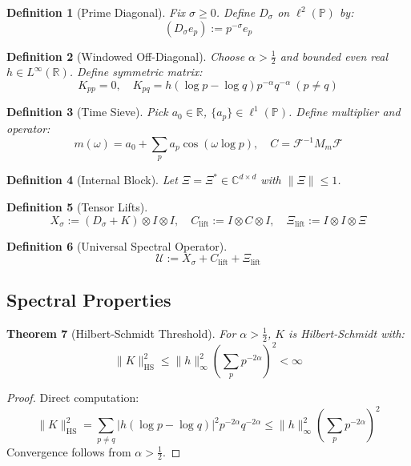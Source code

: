 \documentclass[10pt]{article}
\newtheorem{theorem}{Theorem}
\newtheorem{definition}[theorem]{Definition}
\newcommand{\PP}{\mathbb{P}}
\newcommand{\RR}{\mathbb{R}}
\newcommand{\CC}{\mathbb{C}}
\newcommand{\UU}{\mathcal{U}}
\begin{document}
\begin{definition}[Prime Diagonal]
Fix $\sigma \geq 0$. Define $D_\sigma$ on $\ell^2(\PP)$ by:
\[
(D_\sigma e_p) := p^{-\sigma} e_p
\]
\end{definition}

\begin{definition}[Windowed Off-Diagonal]
Choose $\alpha > \frac{1}{2}$ and bounded even real $h \in L^\infty(\RR)$. Define symmetric matrix:
\[
K_{pp} = 0,\quad K_{pq} = h(\log p - \log q) p^{-\alpha} q^{-\alpha} \ (p \ne q)
\]
\end{definition}

\begin{definition}[Time Sieve]
Pick $a_0 \in \RR$, $\{a_p\} \in \ell^1(\PP)$. Define multiplier and operator:
\[
m(\omega) = a_0 + \sum_p a_p \cos(\omega \log p),\quad C = \mathcal{F}^{-1} M_m \mathcal{F}
\]
\end{definition}

\begin{definition}[Internal Block]
Let $\Xi = \Xi^* \in \CC^{d\times d}$ with $\|\Xi\| \leq 1$.
\end{definition}

\begin{definition}[Tensor Lifts]
\[
X_\sigma := (D_\sigma + K) \otimes I \otimes I,\quad 
C_{\text{lift}} := I \otimes C \otimes I,\quad 
\Xi_{\text{lift}} := I \otimes I \otimes \Xi
\]
\end{definition}

\begin{definition}[Universal Spectral Operator]
\[
\UU := X_\sigma + C_{\text{lift}} + \Xi_{\text{lift}}
\]
\end{definition}

\subsection{Spectral Properties}

\begin{theorem}[Hilbert-Schmidt Threshold]
For $\alpha > \frac{1}{2}$, $K$ is Hilbert-Schmidt with:
\[
\|K\|_{\text{HS}}^2 \leq \|h\|_\infty^2 \left(\sum_p p^{-2\alpha}\right)^2 < \infty
\]
\end{theorem}

\begin{proof}
Direct computation:
\[
\|K\|_{\text{HS}}^2 = \sum_{p \ne q} |h(\log p - \log q)|^2 p^{-2\alpha} q^{-2\alpha} \leq \|h\|_\infty^2 \left(\sum_p p^{-2\alpha}\right)^2
\]
Convergence follows from $\alpha > \frac{1}{2}$.
\end{proof}
\end{document}

